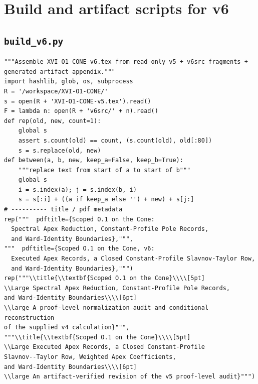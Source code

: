 \documentclass[10pt]{article}
\begin{document}
\section{Build and artifact scripts for v6}
\subsection{\texttt{build\_v6.py}}
\begin{lstlisting}
"""Assemble XVI-O1-CONE-v6.tex from read-only v5 + v6src fragments + generated artifact appendix."""
import hashlib, glob, os, subprocess
R = '/workspace/XVI-O1-CONE/'
s = open(R + 'XVI-O1-CONE-v5.tex').read()
F = lambda n: open(R + 'v6src/' + n).read()
def rep(old, new, count=1):
    global s
    assert s.count(old) == count, (s.count(old), old[:80])
    s = s.replace(old, new)
def between(a, b, new, keep_a=False, keep_b=True):
    """replace text from start of a to start of b"""
    global s
    i = s.index(a); j = s.index(b, i)
    s = s[:i] + ((a if keep_a else '') + new) + s[j:]
# ---------- title / pdf metadata
rep("""  pdftitle={Scoped O.1 on the Cone:
  Spectral Apex Reduction, Constant-Profile Pole Records,
  and Ward-Identity Boundaries},""",
"""  pdftitle={Scoped O.1 on the Cone, v6:
  Executed Apex Records, a Closed Constant-Profile Slavnov-Taylor Row,
  and Ward-Identity Boundaries},""")
rep("""\\title{\\textbf{Scoped O.1 on the Cone}\\\\[5pt]
\\Large Spectral Apex Reduction, Constant-Profile Pole Records,
and Ward-Identity Boundaries\\\\[6pt]
\\large A proof-level normalization audit and conditional reconstruction
of the supplied v4 calculation}""",
"""\\title{\\textbf{Scoped O.1 on the Cone}\\\\[5pt]
\\Large Executed Apex Records, a Closed Constant-Profile
Slavnov--Taylor Row, Weighted Apex Coefficients,
and Ward-Identity Boundaries\\\\[6pt]
\\large An artifact-verified revision of the v5 proof-level audit}""")

\end{lstlisting}
\end{document}
